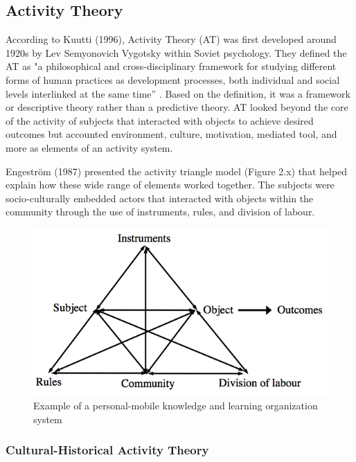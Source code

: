 
\subsection{Activity Theory} 

According to Kuutti (1996)\cite{kuutti1996activity}, Activity Theory (AT) was first developed around 1920s by Lev Semyonovich Vygotsky within Soviet psychology. They defined the AT as "a philosophical and cross-disciplinary framework for studying different forms of human practices as development processes, both individual and social levels interlinked at the same time'' \cite [pp. 23]{kuutti1996activity}. Based on the definition, it was a framework or descriptive theory rather than a predictive theory. AT looked beyond the core of the activity of subjects that interacted with objects to achieve desired outcomes but accounted environment, culture, motivation, mediated tool, and more as elements of an activity system.

 Engestr{\"o}m (1987) \cite{engestrom1999perspectives} presented the activity triangle model (Figure 2.x) that helped explain how these wide range of elements worked together. The subjects were socio-culturally embedded actors that interacted with objects within the community through the use of instruments, rules, and division of labour.

\begin{figure}[!hbt]
\centering
\includegraphics[width=0.7 \textwidth]{ac2}
\caption{Example of a personal-mobile knowledge and learning organization system \cite{vavoula2002kleos}}
\end{figure}

\subsubsection{Cultural-Historical Activity Theory} 

